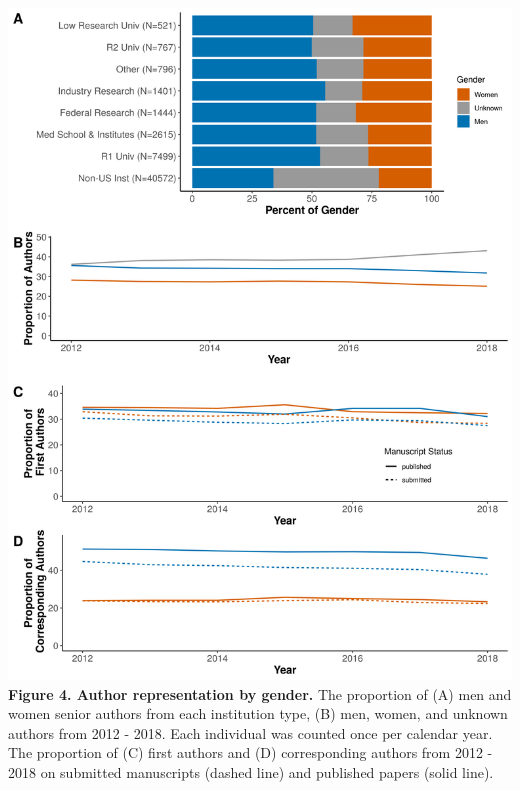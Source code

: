\documentclass[11pt,]{article}
\begin{document}
\includegraphics{Figure_4.png} \textbf{Figure 4. Author representation
by gender.} The proportion of (A) men and women senior authors from each
institution type, (B) men, women, and unknown authors from 2012 - 2018.
Each individual was counted once per calendar year. The proportion of
(C) first authors and (D) corresponding authors from 2012 - 2018 on
submitted manuscripts (dashed line) and published papers (solid line).

\newpage
\end{document}

